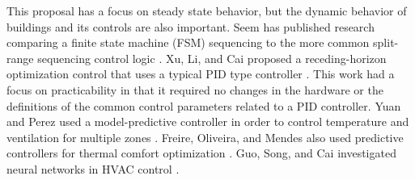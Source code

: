This proposal has a focus on steady state behavior, but the dynamic
behavior of buildings and its controls are also important. Seem has
published research comparing a finite state machine (FSM) sequencing to
the more common split-range sequencing control logic \cite{Seem1999}.
Xu, Li, and Cai proposed a receding-horizon optimization control that
uses a typical PID type controller \cite{XuMin2005}. This work had a
focus on practicability in that it required no changes in the hardware
or  the definitions of the common control parameters related to a PID
controller. Yuan and Perez used a model-predictive controller in order
to control temperature and ventilation for multiple zones
\cite{Yuan2006Multiple-zoneStrategy}. Freire, Oliveira, and Mendes also
used predictive controllers for thermal comfort optimization
\cite{Freire2008PredictiveSavings}.  Guo, Song, and Cai investigated
neural networks in HVAC control \cite{Guo2007}.
